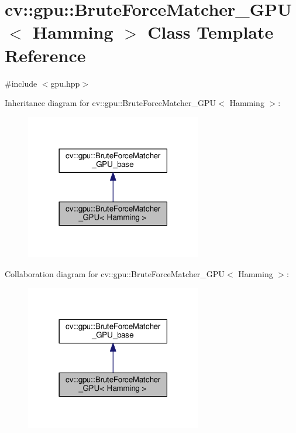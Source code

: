 \hypertarget{classcv_1_1gpu_1_1BruteForceMatcher__GPU_3_01Hamming_01_4}{\section{cv\-:\-:gpu\-:\-:Brute\-Force\-Matcher\-\_\-\-G\-P\-U$<$ Hamming $>$ Class Template Reference}
\label{classcv_1_1gpu_1_1BruteForceMatcher__GPU_3_01Hamming_01_4}
}


{\ttfamily \#include $<$gpu.\-hpp$>$}



Inheritance diagram for cv\-:\-:gpu\-:\-:Brute\-Force\-Matcher\-\_\-\-G\-P\-U$<$ Hamming $>$\-:\nopagebreak
\begin{figure}[H]
\begin{center}
\leavevmode
\includegraphics[width=218pt]{classcv_1_1gpu_1_1BruteForceMatcher__GPU_3_01Hamming_01_4__inherit__graph}
\end{center}
\end{figure}


Collaboration diagram for cv\-:\-:gpu\-:\-:Brute\-Force\-Matcher\-\_\-\-G\-P\-U$<$ Hamming $>$\-:\nopagebreak
\begin{figure}[H]
\begin{center}
\leavevmode
\includegraphics[width=218pt]{classcv_1_1gpu_1_1BruteForceMatcher__GPU_3_01Hamming_01_4__coll__graph}
\end{center}
\end{figure}
